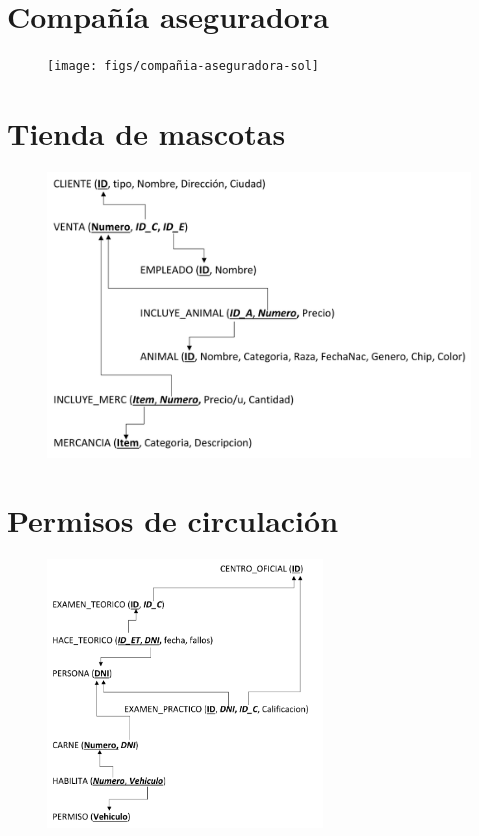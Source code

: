 \documentclass[a4paper]{article}
\begin{document}
\section{Compañía aseguradora}

\begin{figure}[H]
    \texttt{[image: figs/compañia-aseguradora-sol]}
\end{figure}

\section{Tienda de mascotas}

\begin{figure}[H]
    \includegraphics[width=\textwidth]{figs/tienda-de-mascotas-sol}
\end{figure}

\newpage
\section{Permisos de circulación}

\begin{figure}[H]
    \includegraphics[width=0.65\textwidth]{figs/permiso-de-circulacion-sol}
\end{figure}
\end{document}
